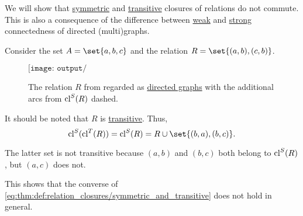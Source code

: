 \begin{example}\label{ex:thm:def:relation_closures/symmetric_and_transitive}
  We will show that \hyperref[def:relation_closures/symmetric]{symmetric} and \hyperref[def:relation_closures/transitive]{transitive} closures of relations do not commute. This is also a consequence of the difference between \hyperref[def:graph_connectedness/weak]{weak} and \hyperref[def:graph_connectedness/strong]{strong} connectedness of directed (multi)graphs.

  Consider the set \( A = \set{ a, b, c } \) and the relation \( R = \set{ (a, b), (c, b) } \).

  \begin{figure}[!ht]
    \begin{equation*}
      \texttt{[image: output/ex\_\_thm\_\_def\_\_relation\_closures\_\_symmetric\_and\_transitive]}
    \end{equation*}
    \caption{The relation \( R \) from  regarded as \hyperref[def:directed_graph]{directed graphs} with the additional arcs from \( \operatorname{cl}^S(R) \) dashed.}\label{fig:ex:thm:def:relation_closures/symmetric_and_transitive}
  \end{figure}

  It should be noted that \( R \) is \hyperref[def:binary_relation/transitive]{transitive}. Thus,
  \begin{equation*}
    \cl^S(\cl^T(R)) = \cl^S(R) = R \cup \set{ (b, a), (b, c) }.
  \end{equation*}

  The latter set is not transitive because \( (a, b) \) and \( (b, c) \) both belong to \( \operatorname{cl}^S(R) \), but \( (a, c) \) does not.

  This shows that the converse of \eqref{eq:thm:def:relation_closures/symmetric_and_transitive} does not hold in general.
\end{example}

